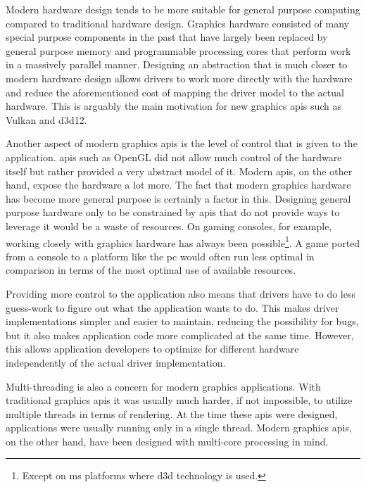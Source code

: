    Modern hardware design tends to be more suitable for general purpose computing compared to traditional hardware design.
    Graphics hardware consisted of many special purpose components in the past that have largely been replaced by general purpose memory and programmable processing cores that perform work in a massively parallel manner.
    Designing an abstraction that is much closer to modern hardware design allows drivers to work more directly with the hardware and reduce the aforementioned cost of mapping the driver model to the actual hardware.
    This is arguably the main motivation for new graphics \glspl{api} such as Vulkan and \gls{d3d12}.

    Another aspect of modern graphics \glspl{api} is the level of control that is given to the application.
    \glspl{api} such as OpenGL did not allow much control of the hardware itself but rather provided a very abstract model of it.
    Modern \glspl{api}, on the other hand, expose the hardware a lot more.
    The fact that modern graphics hardware has become more general purpose is certainly a factor in this.
    Designing general purpose hardware only to be constrained by \glspl{api} that do not provide ways to leverage it would be a waste of resources.
    On gaming consoles, for example, working closely with graphics hardware has always been possible\footnote{Except on \gls{ms} platforms where \gls{d3d} technology is used.}.
    A game ported from a console to a platform like the \gls{pc} would often run less optimal in comparison in terms of the most optimal use of available resources.

    Providing more control to the application also means that drivers have to do less guess-work to figure out what the application wants to do.
    This makes driver implementations simpler and easier to maintain, reducing the possibility for \glspl{bug}, but it also makes application code more complicated at the same time.
    However, this allows application developers to optimize for different hardware independently of the actual driver implementation.

    Multi-threading is also a concern for modern graphics applications.
    With traditional graphics \glspl{api} it was usually much harder, if not impossible, to utilize multiple threads in terms of rendering.
    At the time these \glspl{api} were designed, applications were usually running only in a single thread.
    Modern graphics \glspl{api}, on the other hand, have been designed with multi-core processing in mind.

